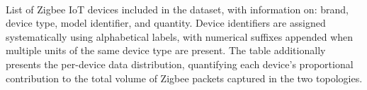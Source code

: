 \begin{table}[t]
\\[5pt]
\caption{List of Zigbee IoT devices included in the dataset, with information on: brand, device type, model identifier, and quantity. Device identifiers are assigned systematically using alphabetical labels, with numerical suffixes appended when multiple units of the same device type are present. The table additionally presents the per-device data distribution, quantifying each device's proportional contribution to the total volume of Zigbee packets captured in the two topologies.}
\label{tab:dataset}
\end{table}
